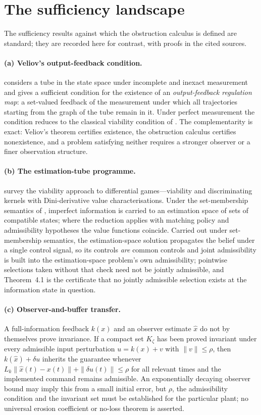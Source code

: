 \documentclass[11pt,a4paper]{article}
\theoremstyle{plain}
\theoremstyle{definition}
\theoremstyle{remark}
\begin{document}
\section{The sufficiency landscape}\label{S:landscape}

The sufficiency results against which the obstruction calculus is defined are standard; they are recorded here for contrast, with proofs in the cited sources.

\paragraph{(a) Veliov's output-feedback condition.} \citet{veliov1993} considers a tube in the state space under incomplete and inexact measurement and gives a sufficient condition for the existence of an \emph{output-feedback regulation map}: a set-valued feedback of the measurement under which all trajectories starting from the graph of the tube remain in it. Under perfect measurement the condition reduces to the classical viability condition of \citet{haddad1981}. The complementarity is exact: Veliov's theorem certifies existence, the obstruction calculus certifies nonexistence, and a problem satisfying neither requires a stronger observer or a finer observation structure.

\paragraph{(b) The estimation-tube programme.} \citet{cardaliaguet2007} survey the viability approach to differential games---viability and discriminating kernels with Dini-derivative value characterisations. Under the set-membership semantics of \citet{kurzhanski1997}, imperfect information is carried to an estimation space of sets of compatible states; where the reduction applies with matching policy and admissibility hypotheses the value functions coincide. Carried out under set-membership semantics, the estimation-space solution propagates the belief under a single control signal, so its controls \emph{are} common controls and joint admissibility is built into the estimation-space problem's own admissibility; pointwise selections taken without that check need not be jointly admissible, and Theorem~4.1 is the certificate that no jointly admissible selection exists at the information state in question.

\paragraph{(c) Observer-and-buffer transfer.} A full-information feedback $k(x)$ and an observer estimate $\hat x$ do not by themselves prove invariance. If a compact set $K_\zeta$ has been proved invariant under every admissible input perturbation $u=k(x)+v$ with $\|v\|\le\rho$, then $k(\hat x)+\delta u$ inherits the guarantee whenever $L_k\|\hat x(t)-x(t)\|+\|\delta u(t)\|\le\rho$ for all relevant times and the implemented command remains admissible. An exponentially decaying observer bound may imply this from a small initial error, but $\rho$, the admissibility condition and the invariant set must be established for the particular plant; no universal erosion coefficient or no-loss theorem is asserted.
\end{document}
